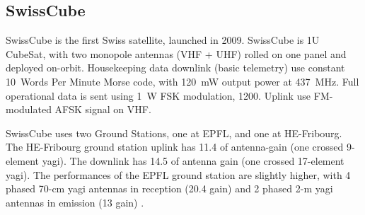 \subsection{SwissCube}
SwissCube is the first Swiss satellite, launched in 2009. SwissCube is 1U CubeSat, with two monopole antennas (VHF + UHF) rolled on one panel and deployed on-orbit. Housekeeping data downlink (basic telemetry) use constant \si{10}~Words Per Minute Morse code, with \SI{120}{\milli\watt} output power at \SI{437}{\MHz}. Full operational data is sent using \SI{1}{\watt} FSK modulation, \SI{1200}{\bps}. Uplink use FM-modulated AFSK signal on VHF. 

SwissCube uses two Ground Stations, one at EPFL, and one at HE-Fribourg. The HE-Fribourg ground station uplink has \SI{11.4}{\dBi} of antenna-gain (one crossed \si{9}-element yagi). The downlink has \SI{14.5}{\dBi} of antenna gain (one crossed \si{17}-element yagi). The performances of the EPFL ground station are slightly higher, with \si{4} phased \si{70}-cm yagi antennas in reception (\SI{20.4}{\dBi} gain) and \si{2} phased \si{2}-m yagi antennas in emission (\SI{13}{\dBi} gain) \cite{swisscube_groundstation}.

